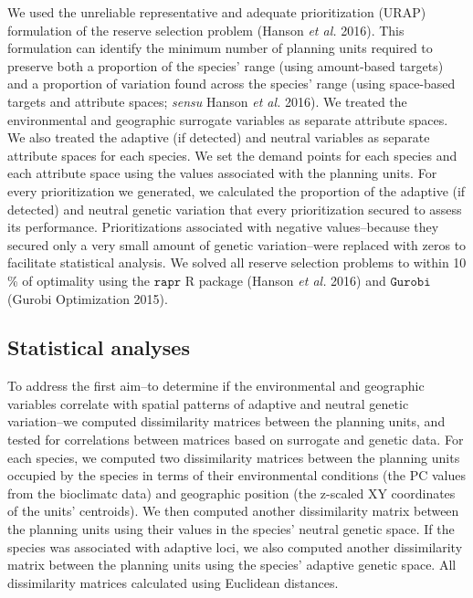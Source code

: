 \documentclass[11pt,]{article}
\begin{document}
We used the unreliable representative and adequate prioritization (URAP)
formulation of the reserve selection problem (Hanson \emph{et al.}
2016). This formulation can identify the minimum number of planning
units required to preserve both a proportion of the species' range
(using amount-based targets) and a proportion of variation found across
the species' range (using space-based targets and attribute spaces;
\emph{sensu} Hanson \emph{et al.} 2016). We treated the environmental
and geographic surrogate variables as separate attribute spaces. We also
treated the adaptive (if detected) and neutral variables as separate
attribute spaces for each species. We set the demand points for each
species and each attribute space using the values associated with the
planning units. For every prioritization we generated, we calculated the
proportion of the adaptive (if detected) and neutral genetic variation
that every prioritization secured to assess its performance.
Prioritizations associated with negative values--because they secured
only a very small amount of genetic variation--were replaced with zeros
to facilitate statistical analysis. We solved all reserve selection
problems to within 10 \% of optimality using the \(\texttt{rapr}\) R
package (Hanson \emph{et al.} 2016) and \(\texttt{Gurobi}\) (Gurobi
Optimization 2015).

\subsection{Statistical analyses}\label{statistical-analyses}

To address the first aim--to determine if the environmental and
geographic variables correlate with spatial patterns of adaptive and
neutral genetic variation--we computed dissimilarity matrices between
the planning units, and tested for correlations between matrices based
on surrogate and genetic data. For each species, we computed two
dissimilarity matrices between the planning units occupied by the
species in terms of their environmental conditions (the PC values from
the bioclimatc data) and geographic position (the z-scaled XY
coordinates of the units' centroids). We then computed another
dissimilarity matrix between the planning units using their values in
the species' neutral genetic space. If the species was associated with
adaptive loci, we also computed another dissimilarity matrix between the
planning units using the species' adaptive genetic space. All
dissimilarity matrices calculated using Euclidean distances.
\end{document}
